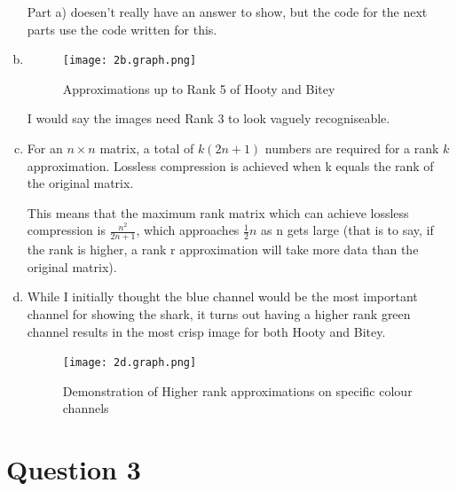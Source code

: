\documentclass[11pt]{article}
\begin{document}
\begin{enumerate}[a)]
Part a) doesen't really have an answer to show, but the code for the next parts use the code written for this.
\item
\begin{figure}
\centering
\texttt{[image: 2b.graph.png]}
\caption{Approximations up to Rank 5 of Hooty and Bitey}
\end{figure}
I would say the images need Rank 3 to look vaguely recogniseable.
\item
For an $n \times n$ matrix, a total of $k(2n + 1)$ numbers are required for a rank $k$ approximation.
Lossless compression is achieved when k equals the rank of the original matrix.

This means that the maximum rank matrix which can achieve lossless compression is $\frac{n^2}{2n+1}$, which approaches $\frac{1}{2}n$ as n gets large (that is to say, if the rank is higher, a rank r approximation will take more data than the original matrix).

\item While I initially thought the blue channel would be the most important channel for showing the shark, it turns out having a higher rank green channel results in the most crisp image for both Hooty and Bitey.
\begin{figure}[h!]
\centering
\texttt{[image: 2d.graph.png]}
\caption{Demonstration of Higher rank approximations on specific colour channels}
\end{figure}
\end{enumerate}

\pagebreak
\section*{Question 3}
\end{document}
